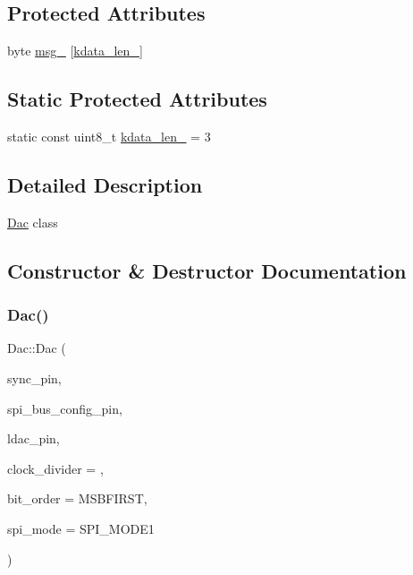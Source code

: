 \subsection*{Protected Attributes}
\begin{DoxyCompactItemize}
\item 
byte \mbox{\hyperlink{classDac_a82d9c857af6ba19123b3f5d5187dce1d}{msg\+\_\+}} \mbox{[}\mbox{\hyperlink{classDac_af3de0bf669183e66ebf916f8c685fe6b}{kdata\+\_\+len\+\_\+}}\mbox{]}
\end{DoxyCompactItemize}
\subsection*{Static Protected Attributes}
\begin{DoxyCompactItemize}
\item 
static const uint8\+\_\+t \mbox{\hyperlink{classDac_af3de0bf669183e66ebf916f8c685fe6b}{kdata\+\_\+len\+\_\+}} = 3
\end{DoxyCompactItemize}


\subsection{Detailed Description}
\mbox{\hyperlink{classDac}{Dac}} class 

\subsection{Constructor \& Destructor Documentation}
\mbox{\label{classDac_ae74afbc4c82a8acbd8c74dcf4ea046ba}} 
\subsubsection{\texorpdfstring{Dac()}{Dac()}}
{\footnotesize\ttfamily Dac\+::\+Dac (\begin{DoxyParamCaption}\item[{uint8\+\_\+t}]{sync\+\_\+pin,  }\item[{uint8\+\_\+t}]{spi\+\_\+bus\+\_\+config\+\_\+pin,  }\item[{uint8\+\_\+t}]{ldac\+\_\+pin,  }\item[{uint8\+\_\+t}]{clock\+\_\+divider = {},  }\item[{Bit\+Order}]{bit\+\_\+order = {\ttfamily MSBFIRST},  }\item[{uint8\+\_\+t}]{spi\+\_\+mode = {\ttfamily SPI\+\_\+MODE1} }\end{DoxyParamCaption})}

